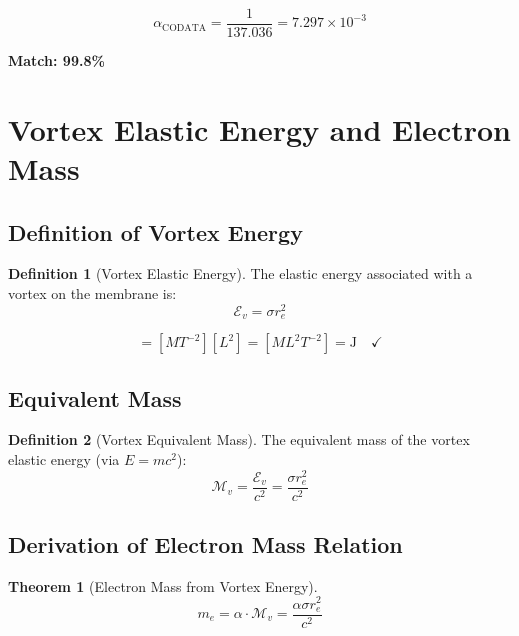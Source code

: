 \documentclass[12pt,a4paper,openany]{book}
\theoremstyle{definition}
\newtheorem{definition}{Definition}[chapter]
\theoremstyle{plain}
\newtheorem{theorem}{Theorem}[chapter]
\theoremstyle{remark}
\newcommand{\Mv}{\mathcal{M}_v}           %
\newcommand{\Ev}{\mathcal{E}_v}           %
\newcommand{\re}{r_e}                      %
\begin{document}
\begin{equation}
\alpha_{\text{CODATA}} = \frac{1}{137.036} = 7.297 \times 10^{-3}
\end{equation}

\textbf{Match: 99.8\%}

\section{Vortex Elastic Energy and Electron Mass}

\subsection{Definition of Vortex Energy}

\begin{definition}[Vortex Elastic Energy]
The elastic energy associated with a vortex on the membrane is:
\begin{equation}
\Ev = \sigma \re^2
\label{eq:Ev_def}
\end{equation}
\end{definition}

\begin{dimcheckbox}
\begin{equation}
[\sigma \re^2] = [M T^{-2}][L^2] = [M L^2 T^{-2}] = \text{J} \quad \checkmark
\end{equation}
\end{dimcheckbox}

\subsection{Equivalent Mass}

\begin{definition}[Vortex Equivalent Mass]
The equivalent mass of the vortex elastic energy (via $E = mc^2$):
\begin{equation}
\Mv = \frac{\Ev}{c^2} = \frac{\sigma \re^2}{c^2}
\label{eq:Mv_def}
\end{equation}
\end{definition}

\subsection{Derivation of Electron Mass Relation}

\begin{theorem}[Electron Mass from Vortex Energy]
\begin{equation}
m_e = \alpha \cdot \Mv = \frac{\alpha \sigma \re^2}{c^2}
\label{eq:me_derived}
\end{equation}
\end{theorem}
\end{document}
